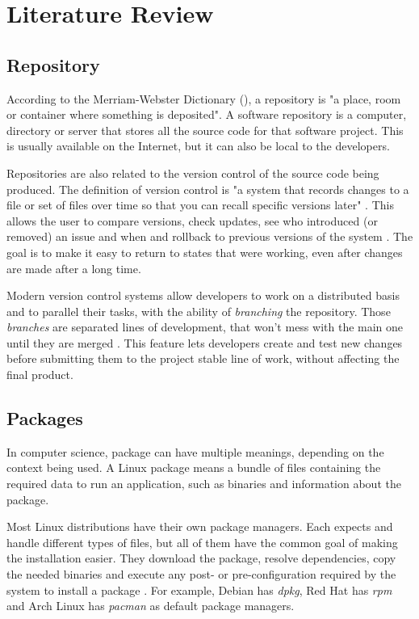 \chapter{Literature Review}
\label {sec:literature_review}

\section{Repository}
\label {sec:repository}

According to the Merriam-Webster Dictionary (\citeyear{webster2017repository}), a repository is "a place, room or container where something is deposited". A software repository is a computer, directory or server that stores all the source code for that software project. This is usually available on the Internet, but it can also be local to the developers.

Repositories are also related to the version control of the source code being produced. The definition of version control is "a system that records changes to a file or set of files over time so that you can recall specific versions later" \cite{chacon2014pro}. This allows the user to compare versions, check updates, see who introduced (or removed) an issue and when and rollback to previous versions of the system \cite{chacon2014pro}. The goal is to make it easy to return to states that were working, even after changes are made after a long time.

Modern version control systems allow developers to work on a distributed basis and to parallel their tasks, with the ability of \textit{branching} the repository. Those \textit{branches} are separated lines of development, that won't mess with the main one until they are merged \cite{chacon2014pro}. This feature lets developers create and test new changes before submitting them to the project stable line of work, without affecting the final product.

\section{Packages}
\label {sec:packages}

In computer science, package can have multiple meanings, depending on the context being used. A Linux package means a bundle of files containing the required data to run an application, such as binaries and information about the package.

Most Linux distributions have their own package managers. Each expects and handle different types of files, but all of them have the common goal of making the installation easier. They download the package, resolve dependencies, copy the needed binaries and execute any post- or pre-configuration required by the system to install a package \cite{linode2017linux}. For example, Debian has \textit{dpkg}, Red Hat has \textit{rpm} and Arch Linux has \textit{pacman} as default package managers.

